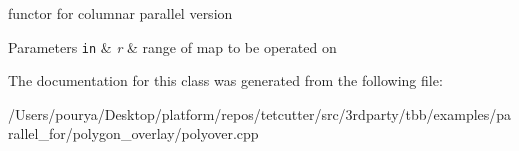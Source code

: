 functor for columnar parallel version 


\begin{DoxyParams}[1]{Parameters}
\mbox{\tt in}  & {\em r} & range of map to be operated on \\
\hline
\end{DoxyParams}


The documentation for this class was generated from the following file\+:\begin{DoxyCompactItemize}
\item 
/\+Users/pourya/\+Desktop/platform/repos/tetcutter/src/3rdparty/tbb/examples/parallel\+\_\+for/polygon\+\_\+overlay/polyover.\+cpp\end{DoxyCompactItemize}
